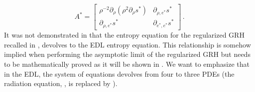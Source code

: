 \documentclass[times,doublespace]{fldauth}%
\begin{document}
 \begin{equation}\label{eq:mat-quad-form}
A^* = 
\begin{bmatrix}
\rho^{-2}\partial_{\rho} \left( \rho^2 \partial_{\rho} s^* \right) & \partial_{\rho,e^*} s^*\\
 \partial_{\rho,e^*} s^* & \partial_{e^*,e^*} s^*
\end{bmatrix}
\,.
\end{equation}
%
It was not demonstrated in \cite{our_jcp_radhy_paper} that the entropy equation for the regularized GRH recalled in , devolves to the EDL entropy equation. This relationship is somehow implied when performing the asymptotic limit of the regularized GRH but needs to be mathematically proved as it will be shown in . We want to emphasize that in the EDL, the system of equations devolves from four to three PDEs (the radiation equation, , is replaced by ).
%
\end{document}
